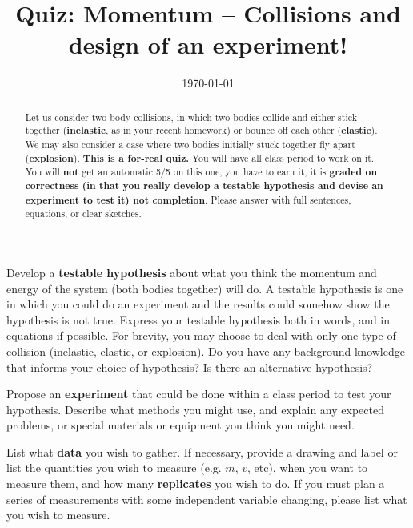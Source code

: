 \documentclass[quiz,addpoints,noanswers]{exam}
\title{Quiz: Momentum -- Collisions and design of an experiment!}
\date{\today}
\author{\mobeardInstructorShort}
\begin{document}
\maketitle

\begin{abstract}
Let us consider two-body collisions, in which two bodies collide and either stick together (\textbf{inelastic}, as in your recent homework) or bounce off each other (\textbf{elastic}). We may also consider a case where two bodies initially stuck together fly apart (\textbf{explosion}).  \textbf{This is a for-real quiz.} You will have all class period to work on it. You will \textbf{not} get an automatic 5/5 on this one, you have to earn it, it is \textbf{graded on correctness (in that you really develop a testable hypothesis and devise an experiment to test it) not completion}. Please answer with full sentences, equations, or clear sketches. 
\end{abstract}



\begin{questions}
\question[2] Develop a \textbf{testable hypothesis} about what you think the momentum and energy of the system (both bodies together) will do. A testable hypothesis is one in which you could do an experiment and the results could somehow show the hypothesis is not true. Express your testable hypothesis both in words, and in equations if possible. For brevity, you may choose to deal with only one type of collision (inelastic, elastic, or explosion). Do you have any background knowledge that informs your choice of hypothesis? Is there an alternative hypothesis? 
\begin{solution}[4in]
\end{solution}

\clearpage
\question[2] Propose an \textbf{experiment} that could be done within a class period to test your hypothesis. Describe what methods you might use, and explain any expected problems, or special materials or equipment you think you might need.
\begin{solution}[3in]
\end{solution}

\question[1] List what \textbf{data} you wish to gather. If necessary, provide a drawing and label or list the quantities you wish to measure (e.g. $m$, $v$, etc), when you want to measure them, and how many \textbf{replicates} you wish to do.  If you must plan a series of measurements with some independent variable changing, please list what you wish to measure.
\begin{solution}[3in]
\end{solution}

\end{questions}
\end{document}
